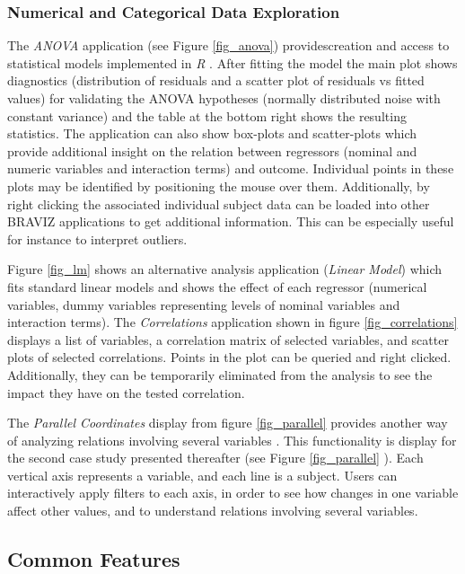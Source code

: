 \documentclass{frontiersHLTH}
\begin{document}
\subsubsection{Numerical and Categorical Data Exploration}

The \emph{ANOVA} application (see Figure \ref{fig_anova}) providescreation and access to statistical models implemented in \emph{R} \cite{team_r:_2012}. After fitting the model the main plot shows diagnostics (distribution of residuals and a scatter plot of residuals vs fitted values) for validating the ANOVA hypotheses (normally distributed noise with constant variance) and the table at the bottom right shows the resulting statistics. The application can also show box-plots and scatter-plots which provide additional insight on the relation between regressors (nominal and numeric variables and interaction terms) and outcome. Individual points in these plots may be identified by positioning the mouse over them. Additionally, by right clicking the associated individual subject data can be loaded into other BRAVIZ applications to get additional information. This can be especially useful for instance to interpret outliers.

Figure \ref{fig_lm} shows an alternative analysis application (\emph{Linear Model}) which fits standard linear models and shows the effect of each regressor (numerical variables, dummy variables representing levels of nominal variables and interaction terms). The \emph{Correlations} application shown in figure \ref{fig_correlations} displays a list of variables, a correlation matrix of selected variables, and scatter plots of selected correlations. Points in the plot can be queried and right clicked. Additionally, they can be temporarily eliminated from the analysis to see the impact they have on the tested correlation. 

The \emph{Parallel Coordinates} display from figure \ref{fig_parallel} provides another way of analyzing relations involving several variables . This functionality is display for the second case study presented thereafter (see Figure \ref{fig_parallel} ). Each vertical axis represents a variable, and each line is a subject. Users can interactively apply filters to each axis, in order to see how changes in one variable affect other values, and to understand relations involving several variables.

\subsection{Common Features}
\end{document}

